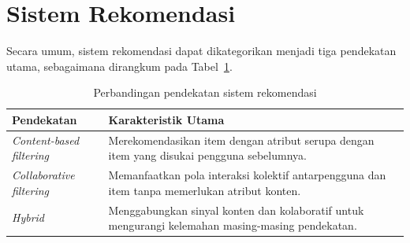 \section{Sistem Rekomendasi}
Secara umum, sistem rekomendasi dapat dikategorikan menjadi tiga pendekatan
utama, sebagaimana dirangkum pada Tabel~\ref{tab:pendekatan}.

\begin{table}[htb]
\centering
\caption{Perbandingan pendekatan sistem rekomendasi}
\label{tab:pendekatan}
\begin{tabularx}{\textwidth}{@{}p{3.2cm}X@{}}
\toprule
\textbf{Pendekatan} & \textbf{Karakteristik Utama} \\
\midrule
\emph{Content-based filtering} & Merekomendasikan item dengan atribut
  serupa dengan item yang disukai pengguna sebelumnya. \\
\emph{Collaborative filtering} & Memanfaatkan pola interaksi kolektif
  antarpengguna dan item tanpa memerlukan atribut konten. \\
\emph{Hybrid} & Menggabungkan sinyal konten dan kolaboratif untuk
  mengurangi kelemahan masing-masing pendekatan. \\
\bottomrule
\end{tabularx}
\end{table}
